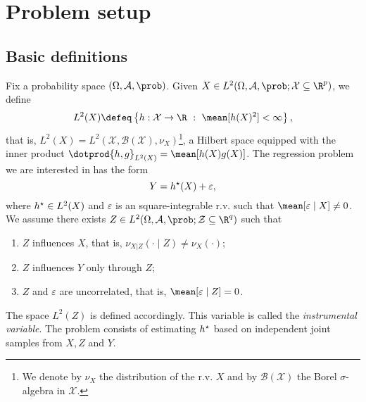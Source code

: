\section{Problem setup}

\subsection{Basic definitions}

Fix a probability space $ ( \Omega, \mathcal{A}, \prob ) $.
Given $ X \in L^{ 2 } ( \Omega, \mathcal{A}, \prob ; \mathcal{X} \subseteq \R^{ p } ) $, we define
\begin{equation*}
    L^{ 2 } ( X ) \defeq \left\{ h : \mathcal{X} \to \R \ : \ \mean [ h ( X )^2 ] < \infty \right\}
,\end{equation*}
that is, $ L^{ 2 } ( X ) = L^{ 2 } ( \mathcal{X}, \mathcal{B} ( \mathcal{X} ), \nu_{ X } ) $\footnote{We denote by $ \nu_{ X } $ the distribution of the r.v. $ X $ and by $ \mathcal{B} ( \mathcal{X} ) $ the Borel $ \sigma $-algebra in $ \mathcal{X} $.}, a Hilbert space equipped with the inner product $ \dotprod{ h, g }_{ L^{ 2 } ( X ) } = \mean [ h ( X ) g ( X ) ] $.
The regression problem we are interested in has the form
\begin{equation}
    \label{eq: main problem}
    Y = h^{ \star } (X) + \varepsilon
,\end{equation}
where $ h^{ \star } \in L^{ 2 } ( X ) $ and $ \varepsilon $ is an square-integrable r.v. such that $ \mean [ \varepsilon \mid X ] \neq 0 $.
We assume there exists $ Z \in L^{ 2 } ( \Omega, \mathcal{A}, \prob ; \mathcal{Z} \subseteq \R^{ q } ) $ such that
\begin{enumerate}[label=\roman*)]
    \item $ Z $ influences $ X $, that is, $ \nu_{ X|Z } ( \cdot \mid Z ) \neq \nu_{ X } ( \cdot ) $;
    \item $ Z $ influences $ Y $ only through $ Z $;
    \item $ Z $ and $ \varepsilon $ are uncorrelated, that is, $ \mean [ \varepsilon \mid Z ] = 0 $.
\end{enumerate}
The space $ L^{ 2 } ( Z ) $ is defined accordingly.
This variable is called the \emph{instrumental variable}.
The problem consists of estimating $ h^{ \star } $ based on independent joint samples from $ X, Z $ and $ Y $.

